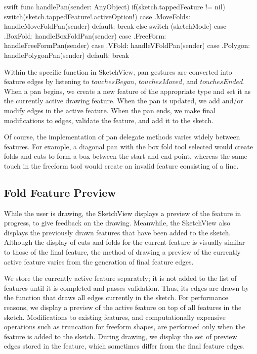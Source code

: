 \small
\singlespacing 

\begin{pygmented}{swift}
    func handlePan(sender: AnyObject) {
        if(sketch.tappedFeature != nil){
            switch(sketch.tappedFeature!.activeOption!){
            case .MoveFolds:
                handleMoveFoldPan(sender)
            default: break
            }
        }
        else{
            switch (sketchMode) {
            case .BoxFold:
                handleBoxFoldPan(sender)
            case .FreeForm:
                handleFreeFormPan(sender)
            case .VFold:
                handleVFoldPan(sender)
            case .Polygon:
                handlePolygonPan(sender)
            default:
                break
            }
        }
    }
\end{pygmented}

\doublespacing
\normalsize

Within the specific function in SketchView, pan gestures are converted
into feature edges by listening to \(touchesBegan\), \(touchesMoved\),
and \(touchesEnded\). When a pan begins, we create a new feature of the
appropriate type and set it as the currently active drawing feature.
When the pan is updated, we add and/or modify edges in the active
feature. When the pan ends, we make final modifications to edges,
validate the feature, and add it to the sketch.

Of course, the implementation of pan delegate methods varies widely
between features. For example, a diagonal pan with the box fold tool
selected would create folds and cuts to form a box between the start and
end point, whereas the same touch in the freeform tool would create an
invalid feature consisting of a line.

\subsection{Fold Feature Preview}\label{fold-feature-preview}

While the user is drawing, the SketchView displays a preview of the
feature in progress, to give feedback on the drawing. Meanwhile, the
SketchView also displays the previously drawn features that have been
added to the sketch. Although the display of cuts and folds for the
current feature is visually similar to those of the final feature, the
method of drawing a preview of the currently active feature varies from
the generation of final feature edges.

We store the currently active feature separately; it is not added to the
list of features until it is completed and passes validation. Thus, its
edges are drawn by the function that draws all edges currently in the
sketch. For performance reasons, we display a preview of the active
feature on top of all features in the sketch. Modifications to existing
features, and computationally expensive operations such as truncation
for freeform shapes, are performed only when the feature is added to the
sketch. During drawing, we display the set of preview edges stored in
the feature, which sometimes differ from the final feature edges.

